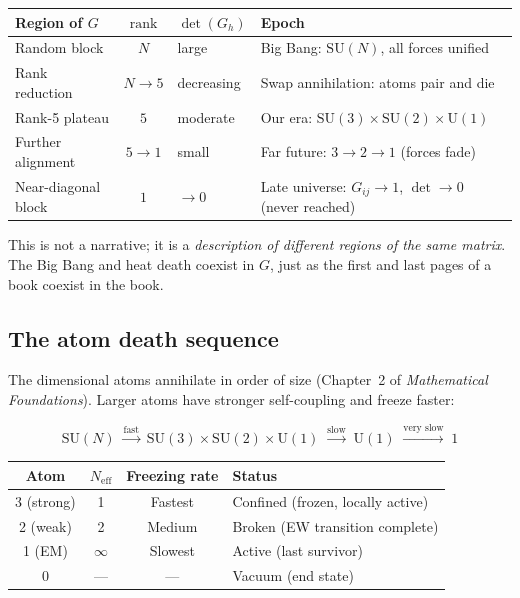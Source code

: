 \begin{center}
\begin{tabular}{lcll}
\hline
Region of $G$ & $\text{rank}$ & $\det(G_h)$ & Epoch \\
\hline
Random block & $N$ & large & Big Bang: $\text{SU}(N)$, all forces unified \\
Rank reduction & $N \to 5$ & decreasing & Swap annihilation: atoms pair and die \\
Rank-5 plateau & $5$ & moderate & Our era: $\text{SU}(3)\!\times\!\text{SU}(2)\!\times\!\text{U}(1)$ \\
Further alignment & $5 \to 1$ & small & Far future: $3 \to 2 \to 1$ (forces fade) \\
Near-diagonal block & $1$ & $\to 0$ & Late universe: $G_{ij} \to 1$, $\det \to 0$ (never reached) \\
\hline
\end{tabular}
\end{center}

This is not a narrative; it is a \emph{description of different regions of the same matrix}. The Big Bang and heat death coexist in $G$, just as the first and last pages of a book coexist in the book.

\subsection{The atom death sequence}

The dimensional atoms annihilate in order of size (Chapter~2 of \textit{Mathematical Foundations}). Larger atoms have stronger self-coupling and freeze faster:

\begin{equation}
\text{SU}(N) \;\xrightarrow{\text{fast}}\; \text{SU}(3) \times \text{SU}(2) \times \text{U}(1) \;\xrightarrow{\text{slow}}\; \text{U}(1) \;\xrightarrow{\text{very slow}}\; 1
\end{equation}

\begin{center}
\begin{tabular}{cccl}
\hline
Atom & $N_\text{eff}$ & Freezing rate & Status \\
\hline
3 (strong) & 1 & Fastest & Confined (frozen, locally active) \\
2 (weak) & 2 & Medium & Broken (EW transition complete) \\
1 (EM) & $\infty$ & Slowest & Active (last survivor) \\
0 & --- & --- & Vacuum (end state) \\
\hline
\end{tabular}
\end{center}

